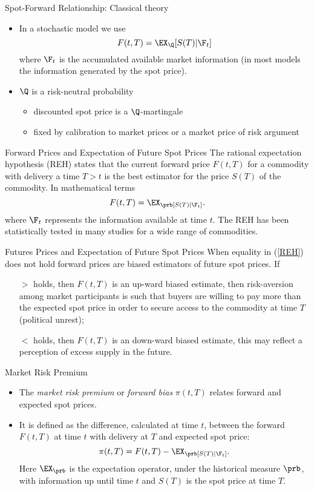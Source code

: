 {Spot-Forward Relationship: Classical theory}
\begin{itemize}
\item<1-> In a stochastic model we use
$$
F(t,T)=\EX_{\Q}[S(T)|\F_t]
$$
where $\F_t$ is the accumulated available market information (in most models the information generated by the spot price).
\item<2-> $\Q$ is a risk-neutral probability
\begin{itemize}
\item discounted spot price is a $\Q$-martingale
\item fixed by calibration to market prices or a market price of risk argument
\end{itemize}
\end{itemize}



{Forward Prices and Expectation of Future Spot Prices}
The rational expectation hypothesis (REH) states that the current forward price $F(t,T)$ for a commodity with
delivery a time $T>t$ is the best estimator for the price $S(T)$ of the commodity.
In mathematical terms
\begin{equation}\label{REH}
F(t,T) = \EX_\prb[S(T) |\F_t].
\end{equation}
where $\F_t$ represents the information available at time $t$. The REH has been statistically
tested in many studies for a wide range of commodities.



{Futures Prices and Expectation of Future Spot Prices}
When equality in (\ref{REH}) does not hold forward prices are biased estimators of
future spot prices. If
\begin{itemize}
\item[$>$] holds, then $F(t,T)$ is an up-ward biased estimate, then risk-aversion
among market participants is such that buyers are willing to pay more than the expected
spot price in order to secure access to the commodity at time $T$ (political unrest);
\item[$<$] holds, then $F(t,T)$ is an down-ward biased estimate, this may reflect a
perception of excess supply in the future.
\end{itemize}




{Market Risk Premium}
\begin{itemize}
\item<1-> The \emph{market risk premium} or \emph{forward bias} $\pi (t,T)$
relates forward and expected spot prices.
\item<2-> It is defined as the difference, calculated at time $t$, between
the forward $F(t,T)$ at time $t$ with delivery at $T$ and expected
spot price:
\begin{equation}\label{forward risk premium}
\pi(t,T)= F(t,T)-\EX_\prb[S(T)| \F_t].
\end{equation}
Here $\EX_\prb$ is the expectation operator, under the
historical measure $\prb$, with information up until time $t$ and
$S(T)$ is the spot price at time $T$.
\end{itemize}


